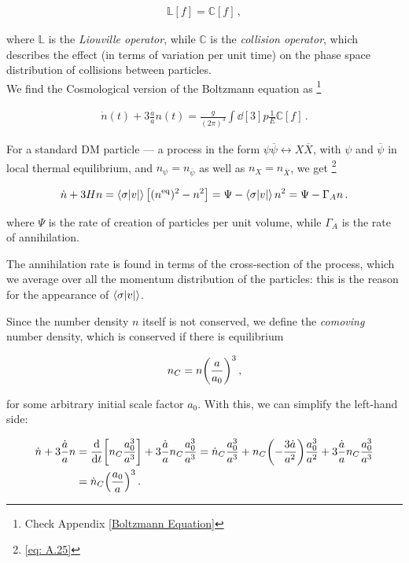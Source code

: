 \begin{align}
    \mathds{L} [f] = \mathds{C} [f]\,,
\end{align}

where \(\mathds{L}\) is the \emph{Liouville operator},  while \(\mathds{C}\) is the \emph{collision operator}, which describes the effect (in terms of variation per unit time) on the phase space distribution of collisions between particles. \\
We find the Cosmological version of the Boltzmann equation as \footnote{Check Appendix \ref{Boltzmann Equation}}

\begin{align}
  \dot{n}(t)
  + 3 \frac{\dot{a}}{a} n(t) = \frac{g}{(2 \pi )^3} \int \dd[3]{p} \frac{1}{E} {\mathbb{C}} [f]
\,.
\end{align}

\hspace{0.5cm}For a standard DM particle --- a process in the form \(\psi \overline{\psi} \leftrightarrow X \overline{X}\), with \(\psi \) and \(\overline{\psi }\) in local thermal equilibrium, and \(n_\psi = n_{\overline{\psi}}\) as well as \(n_X = n_{\overline{X}}\), we get \footnote{\ref{eq: A.25}}

\begin{align}
    \dot{n} + 3 H n = \expval{\sigma \abs{v}} \qty[ (n^{\text{eq}})^2 - n^2] = \Psi - \expval{\sigma \abs{v} } n^2 = \Psi - \Gamma_A n\,.
\end{align}

where \(\Psi \) is the rate of creation of particles per unit volume, while \(\Gamma_A\) is the rate of annihilation. 

The annihilation rate is found in terms of the cross-section of the process, which we average over all the momentum distribution of the particles: this is the reason for the appearance of \(\expval{\sigma \abs{v}}\).

Since the number density \(n\) itself is not conserved, we define the \emph{comoving} number density, which is conserved if there is equilibrium

\begin{align}
  n_C = n \qty(\frac{a}{a_0 })^3\,,
\end{align}

for some arbitrary initial scale factor \(a_0 \).
With this, we can simplify the left-hand side: 

\begin{align}
  \dot{n} + 3 \frac{\dot{a}}{a} n 
  &= \dv{}{t} \qty[n_C \frac{a_0^3}{a^3}] + 3 \frac{\dot{a}}{a} n_C \frac{a_0^3}{a^3} = \dot{n}_C \frac{a_0^3}{a^3} 
  + n_C \qty(-\frac{3 \dot{a}}{a^2}) \frac{a_0^3}{a^2}
  + 3 \frac{\dot{a}}{a} n_C \frac{a_0^3}{a^3}  \\
  &= \dot{n}_C \qty(\frac{a_0 }{a})^3
\,.
\end{align}


